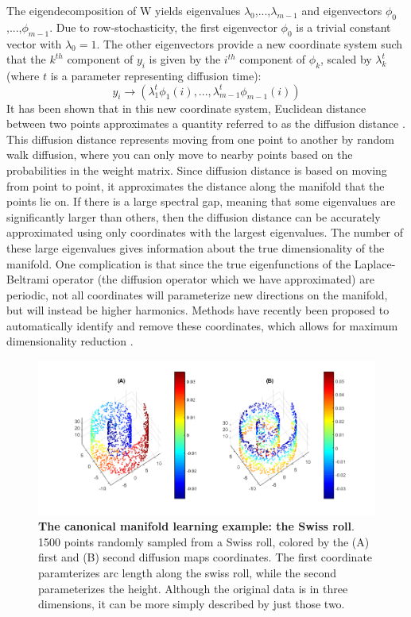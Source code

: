 \documentclass[12pt]{article}
\begin{document}
The eigendecomposition of W yields eigenvalues $\lambda _0$,...,$\lambda_{m-1}$ and eigenvectors $\phi _0$,...,$\phi_{m-1}$. Due to row-stochasticity, the first eigenvector $\phi_0$ is a trivial constant vector with $\lambda_0 = 1$. The other eigenvectors provide a new coordinate system such that the $k^{th}$ component of $y_i$ is given by the $i^{th}$ component of $\phi_k$, scaled by $\lambda_k^t$ (where $t$ is a parameter representing diffusion time):
\[
y_i \rightarrow \left(\lambda_1^t\phi_1(i),...,\lambda_{m-1}^t\phi_{m-1}(i) \right)
\]
It has been shown that in this new coordinate system, Euclidean distance between two points approximates a quantity referred to as the diffusion distance \cite{Coifman2006}. This diffusion distance represents moving from one point to another by random walk diffusion, where you can only move to nearby points based on the probabilities in the weight matrix. Since diffusion distance is based on moving from point to point, it approximates the distance along the manifold that the points lie on. If there is a large spectral gap, meaning that some eigenvalues are significantly larger than others, then the diffusion distance can be accurately approximated using only coordinates with the largest eigenvalues.  The number of these large eigenvalues gives information about the true dimensionality of the manifold. One complication is that since the true eigenfunctions of the Laplace-Beltrami operator (the diffusion operator which we have approximated) are periodic, not all coordinates will parameterize new directions on the manifold, but will instead be higher harmonics. Methods have recently been proposed to automatically identify and remove these coordinates, which allows for maximum dimensionality reduction \cite{Dsilva2015}.

\begin{figure}[h]
\includegraphics[width=\linewidth]{figures/swissroll}
\caption{\textbf{The canonical manifold learning example: the Swiss roll}. 1500 points randomly sampled from a Swiss roll, colored by the (A) first and (B) second diffusion maps coordinates. The first coordinate paramterizes arc length along the swiss roll, while the second parameterizes the height. Although the original data is in three dimensions, it can be more simply described by just those two.}
\label{fig:sr}
\end{figure}
\end{document}
